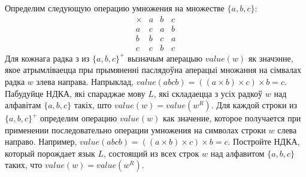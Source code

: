 \documentclass[12pt, a4paper]{article}
\begin{document}
\begin{problemList}
{Определим следующую операцию умножения на множестве $\{a, b, c\}$:}
{%
\[
\begin{matrix}
\times & a & b & c \\
a & c & a & b \\
b & b & c & a \\
c & c & b & c
\end{matrix}
\]
}
{Для кожнага радка з из $\{a, b, c\}^+$ вызначым аперацыю $value(w)$ як значэнне, якое атрымліваецца пры прымяненні паслядоўна аперацыі множання на сімвалах радка $w$ злева направа. Напрыклад, $value(abcb) = ((a\times b)\times c)\times b=c$. Пабудуйце НДКА, які спараджае мову $L$, які складаецца з усіх радкоў $w$ над алфавітам $\{a, b, c\}$ такіх, што $value(w)=value(w^R)$.}
{Для каждой строки из $\{a, b, c\}^+$ определим операцию $value(w)$ как значение, которое получается при применении последовательно операции умножения на символах строки $w$ слева направо. Например, $value(abcb) = ((a\times b)\times c)\times b=c$. Постройте НДКА, который порождает язык $L$, состоящий из всех строк $w$ над алфавитом $\{a, b, c\}$ таких, что $value(w)=value(w^R)$.}

\end{problemList}
\end{document}
